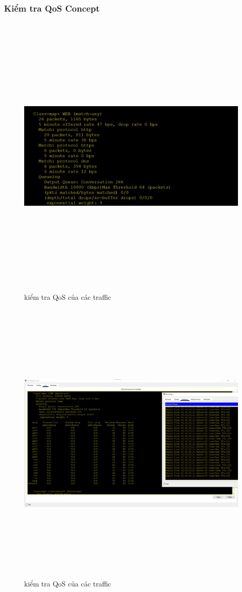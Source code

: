 \documentclass[a4paper, 12pt]{article}
\begin{document}
\subsubsection{Kiểm tra QoS Concept}
\begin{figure}[H]
    \centering
    \includegraphics[width=16cm, height=14cm]{img/qos1.png}
    \caption{kiểm tra QoS của các traffic}
    \label{qos1}
\end{figure}
\begin{figure}[H]
    \centering
    \includegraphics[width=16cm, height=14cm]{img/qos2.png}
    \caption{kiểm tra QoS của các traffic}
    \label{qos2}
\end{figure}
\cleardoublepage
\end{document}
